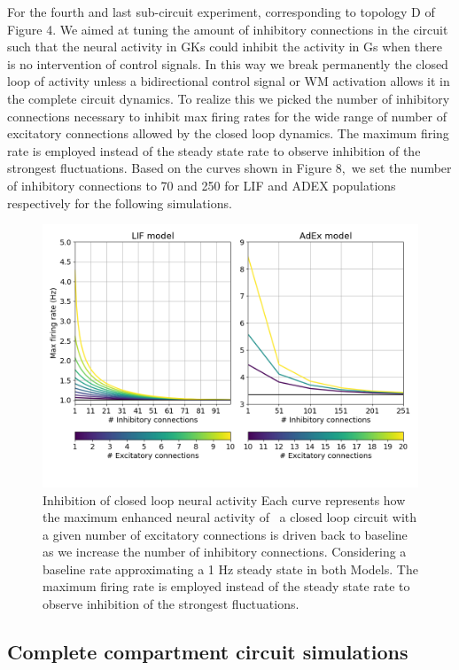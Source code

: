 \documentclass[10pt]{article}
\begin{document}
For the fourth and last sub-circuit experiment, corresponding to
topology D of Figure 4. We aimed at tuning the amount of inhibitory
connections in the circuit such that the neural activity in GKs could
inhibit the activity in Gs when there is no intervention of control
signals. In this way we break permanently the closed loop of activity
unless a bidirectional control signal or WM activation allows it in the
complete circuit dynamics. To realize this we picked the number of
inhibitory connections necessary to inhibit max firing rates for the
wide range of number of excitatory connections allowed by the closed
loop dynamics. The maximum firing rate is employed instead of the steady
state rate to observe inhibition of the strongest fluctuations. Based on
the curves shown in Figure 8,~we set the number of inhibitory
connections to 70 and 250 for LIF and ADEX populations respectively for
the following simulations.



\begin{figure}[h!]
\begin{center}
\includegraphics[width=0.70\columnwidth]{figures/experiment_4/experiment_4}
\caption{{Inhibition of closed loop neural activity
{\label{970310}}
Each curve represents how the maximum enhanced neural activity of ~a
closed loop circuit with a given number of excitatory connections is
driven back to baseline as we increase the number of inhibitory
connections. Considering a baseline rate approximating a 1 Hz steady
state in both Models. The maximum firing rate is employed instead of the
steady state rate to observe inhibition of the strongest fluctuations.
{\label{970310}}%
}}
\end{center}
\end{figure}

\subsection{Complete compartment circuit
simulations}
\end{document}
